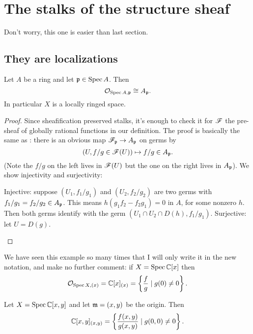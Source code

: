 \section{The stalks of the structure sheaf}

Don't worry, this one is easier than last section.

\subsection{They are localizations}
\begin{theorem}
	Let $A$ be a ring and let $\mathfrak p \in \operatorname{Spec} A$.
	Then \[ \mathcal O_{\operatorname{Spec} A, \mathfrak p} \cong A_\mathfrak p. \]
	In particular $X$ is a locally ringed space.
\end{theorem}
\begin{proof}
	Since sheafification preserved stalks,
	it's enough to check it for $\mathscr F$ the pre-sheaf
	of globally rational functions in our definition.
	The proof is basically the same as :
	there is an obvious map $\mathscr F_\mathfrak p \to A_\mathfrak p$ on germs by
	\[ \left(U, f/g \in \mathscr F(U) \right)
		\mapsto f/g \in A_\mathfrak p . \]
	(Note the $f/g$ on the left lives in $\mathscr F(U)$
	but the one on the right lives in $A_\mathfrak p$).
	We show injectivity and surjectivity:
	\begin{itemize}
		\ii Injective: suppose $(U_1, f_1 / g_1)$ and $(U_2, f_2 / g_2)$
		are two germs with $f_1/g_1 = f_2/g_2 \in A_\mathfrak p$.
		This means $h(g_1 f_2 - f_2 g_1) = 0$ in $A$, for some nonzero $h$.
		Then both germs identify with
		the germ $(U_1 \cap U_2 \cap D(h), f_1 / g_1)$.
		\ii Surjective: let $U = D(g)$. \qedhere
	\end{itemize}
\end{proof}

\begin{example}
	We have seen this example so many times
	that I will only write it in the new notation,
	and make no further comment:
	if $X = \operatorname{Spec} \mathbb C[x]$ then
	\[ \mathcal O_{\operatorname{Spec} X, (x)} = \mathbb C[x]_{(x)}
		= \left\{  \frac fg \mid g(0) \neq 0 \right\}. \]
\end{example}
\begin{example}
	Let $X = \operatorname{Spec} \mathbb C[x,y]$ and let $\mathfrak m = (x,y)$ be the origin.
	Then
	\[ \mathbb C[x,y]_{(x,y)}
		= \left\{ \frac{f(x,y)}{g(x,y)} \mid g(0,0) \neq 0 \right\}. \]
\end{example}

